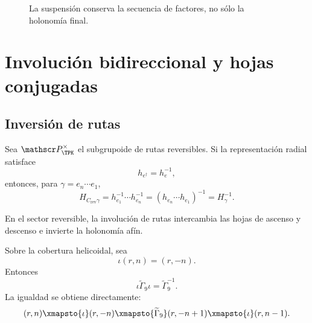 \begin{figure}[htbp]
\centering
{}
\caption{La suspensión conserva la secuencia de factores, no sólo la holonomía final.}
\label{espiral:fig:skew-ledger}
\end{figure}

\chapter{Involución bidireccional y hojas conjugadas}

\section{Inversión de rutas}

Sea \(\mathscr P_{\TPK}^{\times}\) el subgrupoide de rutas reversibles. Si
la representación radial satisface
\[
 h_{e^\dagger}=h_e^{-1},
\]
entonces, para
\(\gamma=e_n\cdots e_1\),
\[
 H_{C_{\mathrm{rev}}\gamma}
 =h_{e_1}^{-1}\cdots h_{e_n}^{-1}
 =(h_{e_n}\cdots h_{e_1})^{-1}
 =H_\gamma^{-1}.
\]

\begin{theorem}
En el sector reversible, la involución de rutas intercambia las hojas de
ascenso y descenso e invierte la holonomía afín.
\end{theorem}

Sobre la cobertura helicoidal, sea
\[
 \iota(r,n)=(r,-n).
\]
Entonces
\begin{equation}
 \iota\widetilde\Gamma_9\iota
 =\widetilde\Gamma_9^{-1}.
 \label{espiral:eq:involucion-helice}
\end{equation}
La igualdad se obtiene directamente:
\[
 (r,n)\xmapsto{\iota}(r,-n)
 \xmapsto{\widetilde\Gamma_9}(r,-n+1)
 \xmapsto{\iota}(r,n-1).
\]

